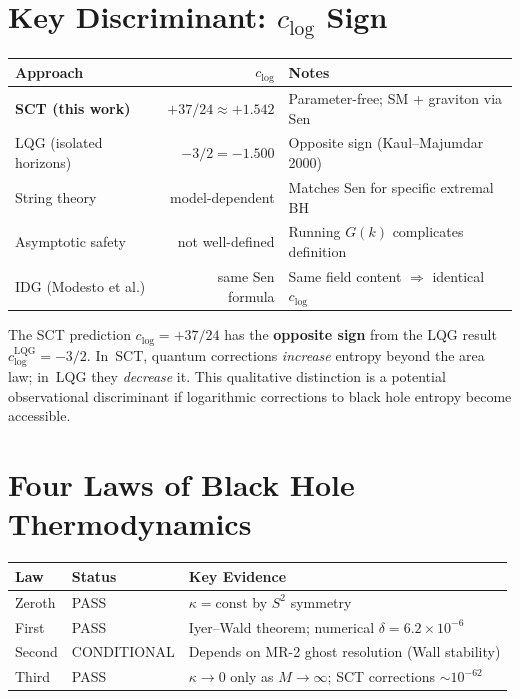 \documentclass[11pt,a4paper]{article}
\begin{document}
\section{Key Discriminant: $c_{\log}$ Sign}

\begin{center}
\begin{tabular}{lrl}
\toprule
\textbf{Approach} & $c_{\log}$ & \textbf{Notes} \\
\midrule
\textbf{SCT (this work)} & $+37/24 \approx +1.542$ & Parameter-free; SM + graviton via Sen \\
LQG (isolated horizons) & $-3/2 = -1.500$ & Opposite sign (Kaul--Majumdar 2000) \\
String theory & model-dependent & Matches Sen for specific extremal BH \\
Asymptotic safety & not well-defined & Running $G(k)$ complicates definition \\
IDG (Modesto et al.) & same Sen formula & Same field content $\Rightarrow$ identical $c_{\log}$ \\
\bottomrule
\end{tabular}
\end{center}

The SCT prediction $c_{\log} = +37/24$ has the \textbf{opposite sign} from the LQG
result $c_{\log}^{\mathrm{LQG}} = -3/2$. In~SCT, quantum corrections \emph{increase}
entropy beyond the area law; in~LQG they \emph{decrease} it. This qualitative
distinction is a potential observational discriminant if logarithmic corrections
to black hole entropy become accessible.

\section{Four Laws of Black Hole Thermodynamics}

\begin{center}
\begin{tabular}{lll}
\toprule
\textbf{Law} & \textbf{Status} & \textbf{Key Evidence} \\
\midrule
Zeroth & \textcolor{statusgreen}{PASS} & $\kappa = \mathrm{const}$ by $S^2$ symmetry \\
First  & \textcolor{statusgreen}{PASS} & Iyer--Wald theorem; numerical $\delta = 6.2\times10^{-6}$ \\
Second & \textcolor{statusamber}{CONDITIONAL} & Depends on MR-2 ghost resolution (Wall stability) \\
Third  & \textcolor{statusgreen}{PASS} & $\kappa \to 0$ only as $M \to \infty$; SCT corrections $\sim 10^{-62}$ \\
\bottomrule
\end{tabular}
\end{center}
\end{document}
